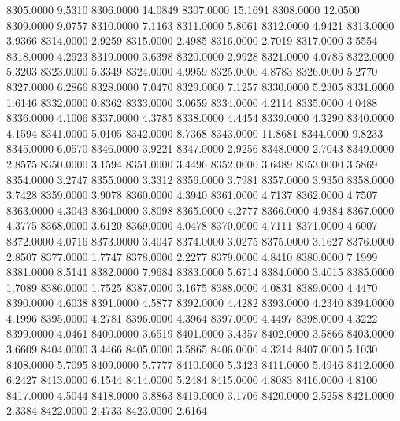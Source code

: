 8305.0000      9.5310
8306.0000     14.0849
8307.0000     15.1691
8308.0000     12.0500
8309.0000      9.0757
8310.0000      7.1163
8311.0000      5.8061
8312.0000      4.9421
8313.0000      3.9366
8314.0000      2.9259
8315.0000      2.4985
8316.0000      2.7019
8317.0000      3.5554
8318.0000      4.2923
8319.0000      3.6398
8320.0000      2.9928
8321.0000      4.0785
8322.0000      5.3203
8323.0000      5.3349
8324.0000      4.9959
8325.0000      4.8783
8326.0000      5.2770
8327.0000      6.2866
8328.0000      7.0470
8329.0000      7.1257
8330.0000      5.2305
8331.0000      1.6146
8332.0000      0.8362
8333.0000      3.0659
8334.0000      4.2114
8335.0000      4.0488
8336.0000      4.1006
8337.0000      4.3785
8338.0000      4.4454
8339.0000      4.3290
8340.0000      4.1594
8341.0000      5.0105
8342.0000      8.7368
8343.0000     11.8681
8344.0000      9.8233
8345.0000      6.0570
8346.0000      3.9221
8347.0000      2.9256
8348.0000      2.7043
8349.0000      2.8575
8350.0000      3.1594
8351.0000      3.4496
8352.0000      3.6489
8353.0000      3.5869
8354.0000      3.2747
8355.0000      3.3312
8356.0000      3.7981
8357.0000      3.9350
8358.0000      3.7428
8359.0000      3.9078
8360.0000      4.3940
8361.0000      4.7137
8362.0000      4.7507
8363.0000      4.3043
8364.0000      3.8098
8365.0000      4.2777
8366.0000      4.9384
8367.0000      4.3775
8368.0000      3.6120
8369.0000      4.0478
8370.0000      4.7111
8371.0000      4.6007
8372.0000      4.0716
8373.0000      3.4047
8374.0000      3.0275
8375.0000      3.1627
8376.0000      2.8507
8377.0000      1.7747
8378.0000      2.2277
8379.0000      4.8410
8380.0000      7.1999
8381.0000      8.5141
8382.0000      7.9684
8383.0000      5.6714
8384.0000      3.4015
8385.0000      1.7089
8386.0000      1.7525
8387.0000      3.1675
8388.0000      4.0831
8389.0000      4.4470
8390.0000      4.6038
8391.0000      4.5877
8392.0000      4.4282
8393.0000      4.2340
8394.0000      4.1996
8395.0000      4.2781
8396.0000      4.3964
8397.0000      4.4497
8398.0000      4.3222
8399.0000      4.0461
8400.0000      3.6519
8401.0000      3.4357
8402.0000      3.5866
8403.0000      3.6609
8404.0000      3.4466
8405.0000      3.5865
8406.0000      4.3214
8407.0000      5.1030
8408.0000      5.7095
8409.0000      5.7777
8410.0000      5.3423
8411.0000      5.4946
8412.0000      6.2427
8413.0000      6.1544
8414.0000      5.2484
8415.0000      4.8083
8416.0000      4.8100
8417.0000      4.5044
8418.0000      3.8863
8419.0000      3.1706
8420.0000      2.5258
8421.0000      2.3384
8422.0000      2.4733
8423.0000      2.6164

